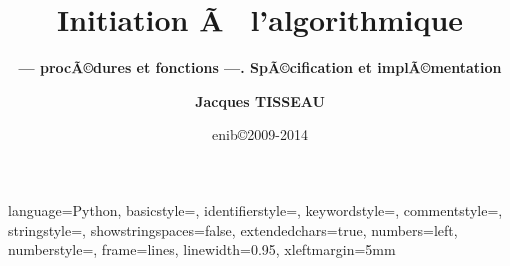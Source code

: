 


\newtheorem{rem}{Remarque}[section]
\newtheorem{defin}{DÃ©finition}[section]
\newtheorem{td}{\color{blue}TD}[section]

\lstset
{
language=Python,
basicstyle=\ttfamily,
identifierstyle=\ttfamily,
keywordstyle=\color{blue}\ttfamily,
commentstyle=\color{gray}\ttfamily,
stringstyle=\color{green}\ttfamily,
showstringspaces=false,
extendedchars=true,
numbers=left, 
numberstyle=\tiny,
frame=lines,
linewidth=0.95\textwidth,
xleftmargin=5mm
} 

\def\exo#1{\mbox{}\ \hfill\mbox{\color{blue}$\rule{2mm}{2mm}\,$\footnotesize\sc TD\ref{#1}}}
\def\exercice#1#2{\mbox{}\ \ TD \ref{#1}\ #2\ \dotfill\ \pageref{#1}\mbox{}}

\newenvironment{py}[1]{\begin{minipage}[t]{#1}\footnotesize}{\end{minipage}}

\graphicspath{{../../fig/}}

\title[Algorithmique]{\bf Initiation Ã  l'algorithmique}
\subtitle{\bf --- procÃ©dures et fonctions ---. SpÃ©cification et implÃ©mentation}


\author[\tt jacques.tisseau@enib.fr]{\large\bf Jacques TISSEAU}
\institute[\enib]{{\large\enib--\cerv}}
\date[enib\copyright 2009-2014]{\footnotesize enib\copyright 2009-2014}



